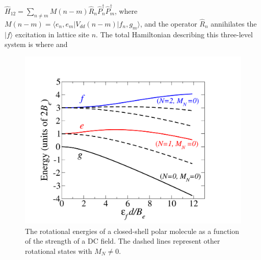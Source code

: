 $\hat{H}_{12} = \sum\limits_{n \neq m} M(n-m) \hat{R}_n  \hat{P}_n^\dag
\hat{P}_m^\dag$, where $M(n-m) = \langle e_{n},e_{m} | V_{dd}(n-m) | f_{n},g_{m}
\rangle$, and the operator $\hat{R}_n$ annihilates the $| f \rangle$
excitation in lattice site $n$. The total Hamiltonian describing this three-level 
system is 
 where
 and 

\begin{figure}[htbp]
\centering
\includegraphics[width=\linewidth]{Figure3.pdf}
\caption{The rotational energies of a closed-shell polar molecule as a function of the strength of a DC field. The
 dashed lines represent other rotational states with $M_{N} \neq 0$. 
}
\label{fig:rotationalEnergy}
\end{figure}





